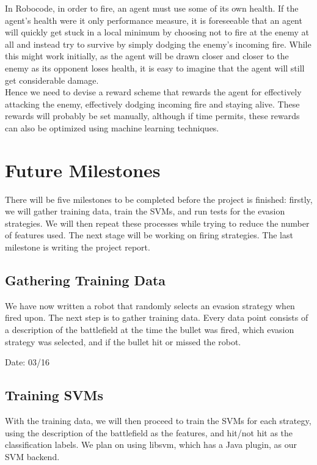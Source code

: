 \documentclass{article}
\theoremstyle{plain}
\theoremstyle{definition}
\theoremstyle{remark}
\begin{document}
In Robocode, in order to fire, an agent must use some of its own health. If the agent's health were it only performance measure, it is foreseeable that an agent will quickly get stuck in a local minimum by choosing not to fire at the enemy at all and instead try to survive by simply dodging the enemy's incoming fire. While this might work initially, as the agent will be drawn closer and closer to the enemy as its opponent loses health, it is easy to imagine that the agent will still get considerable damage.\\

Hence we need to devise a reward scheme that rewards the agent for effectively attacking the enemy, effectively dodging incoming fire and staying alive. These rewards will probably be set manually, although if time permits, these rewards can also be optimized using machine learning techniques.

\section{Future Milestones}
There will be five milestones to be completed before the project is finished: firstly, we will gather training data, train the SVMs,
and run tests for the evasion strategies. We will then repeat these processes while trying to reduce the number of features used. The next stage will be working on firing strategies. The last milestone is writing the
project report.

\subsection{Gathering Training Data}
We have now written a robot that randomly selects an evasion strategy when fired upon. The next step is 
to gather training data. Every data point consists of a description of the battlefield at the time the bullet was fired, which
evasion strategy was selected, and if the bullet hit or missed the robot.

Date: 03/16

\subsection{Training SVMs}
With the training data, we will then proceed to train the SVMs for each strategy, using the description of the battlefield as
the features, and hit/not hit as the classification labels. We plan on using libsvm, which has a Java plugin, as our SVM backend.
\end{document}
